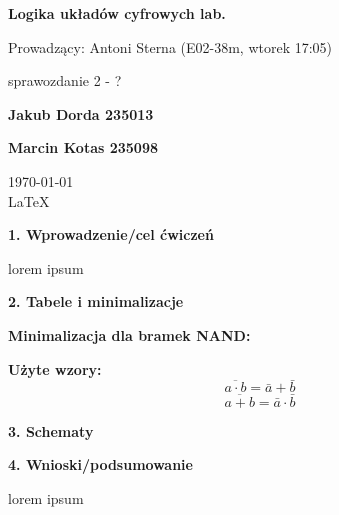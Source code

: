 \documentclass[12pt,a4paper]{report}
\begin{document}
	
	\begin{titlepage}
		
		\centering
		{\huge\bfseries Logika układów cyfrowych lab.\par}
		
		\vspace{0.5cm}
		Prowadzący: Antoni Sterna (E02-38m, wtorek 17:05) \\
	
		\vspace{1.1cm}
		{\Large sprawozdanie 2 - ?\par}
		\vfill
		
		{\large\bfseries Jakub Dorda 235013\par}
		{\large\bfseries Marcin Kotas 235098\par}
		
		\vspace{1cm}
		\today \\ \LaTeX
		
		\restoregeometry
	\end{titlepage}
	
	
	{\large\bfseries 1. Wprowadzenie/cel ćwiczeń\\}
	
	lorem ipsum
	
	\vspace{0.8cm}
	{\large\bfseries 2. Tabele i minimalizacje}
	
	
	
	{\bfseries Minimalizacja dla bramek NAND:}
	
	
	
	{\bfseries Użyte wzory:}
	\begin{equation}
	\overline{a\cdot b}=\bar{a}+\bar{b}
	\end{equation}
	\begin{equation}
	\overline{a+b}=\bar{a}\cdot\bar{b}
	\end{equation}
	
	
	\vspace{0.5cm}
	{\large\bfseries 3. Schematy}

	
	
	\vspace{0.5cm}
	{\large\bfseries 4. Wnioski/podsumowanie\\}
	
	lorem ipsum
	
\end{document}
